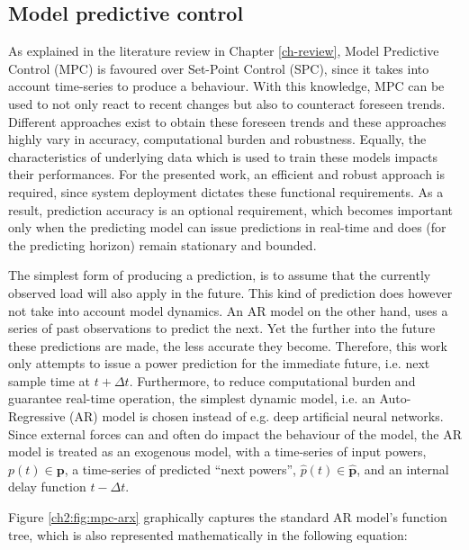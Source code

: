 \subsection{Model predictive control}

As explained in the literature review in Chapter \ref{ch-review}, Model Predictive Control (MPC) is favoured over Set-Point Control (SPC), since it takes into account time-series to produce a behaviour.
With this knowledge, MPC can be used to not only react to recent changes but also to counteract foreseen trends.
Different approaches exist to obtain these foreseen trends and these approaches highly vary in accuracy, computational burden and robustness.
Equally, the characteristics of underlying data which is used to train these models impacts their performances.
For the presented work, an efficient and robust approach is required, since system deployment dictates these functional requirements.
As a result, prediction accuracy is an optional requirement, which becomes important only when the predicting model can issue predictions in real-time and does (for the predicting horizon) remain stationary and bounded.

The simplest form of producing a prediction, is to assume that the currently observed load will also apply in the future.
This kind of prediction does however not take into account model dynamics.
An AR model on the other hand, uses a series of past observations to predict the next.
Yet the further into the future these predictions are made, the less accurate they become.
Therefore, this work only attempts to issue a power prediction for the immediate future, i.e. next sample time at $t+\Delta t$.
Furthermore, to reduce computational burden and guarantee real-time operation, the simplest dynamic model, i.e. an Auto-Regressive (AR) model is chosen instead of e.g. deep artificial neural networks.
Since external forces can and often do impact the behaviour of the model, the AR model is treated as an exogenous model, with a time-series of input powers, $p(t) \in \textbf{p}$, a time-series of predicted ``next powers'', $\hat{p}(t) \in \hat{\textbf{p}}$, and an internal delay function $t-\Delta t$.



Figure \ref{ch2:fig:mpc-arx} graphically captures the standard AR model's function tree, which is also represented mathematically in the following equation:



